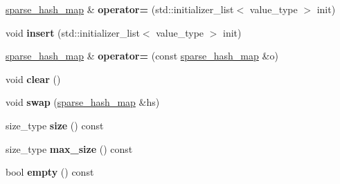 \begin{DoxyCompactItemize}
\item 
\hyperlink{classspp___1_1sparse__hash__map}{sparse\+\_\+hash\+\_\+map} \& {\bfseries operator=} (std\+::initializer\+\_\+list$<$ value\+\_\+type $>$ init)\hypertarget{classspp___1_1sparse__hash__map_abc26f86eaa71c65110261637dbeccb91}{}\label{classspp___1_1sparse__hash__map_abc26f86eaa71c65110261637dbeccb91}

\item 
void {\bfseries insert} (std\+::initializer\+\_\+list$<$ value\+\_\+type $>$ init)\hypertarget{classspp___1_1sparse__hash__map_a76f10efad8d33a8b331db9bcf23b795c}{}\label{classspp___1_1sparse__hash__map_a76f10efad8d33a8b331db9bcf23b795c}

\item 
\hyperlink{classspp___1_1sparse__hash__map}{sparse\+\_\+hash\+\_\+map} \& {\bfseries operator=} (const \hyperlink{classspp___1_1sparse__hash__map}{sparse\+\_\+hash\+\_\+map} \&o)\hypertarget{classspp___1_1sparse__hash__map_a1b28975f5957feb258bda6e942fd7b6c}{}\label{classspp___1_1sparse__hash__map_a1b28975f5957feb258bda6e942fd7b6c}

\item 
void {\bfseries clear} ()\hypertarget{classspp___1_1sparse__hash__map_abf0b2413fd153412923a48c2d912b198}{}\label{classspp___1_1sparse__hash__map_abf0b2413fd153412923a48c2d912b198}

\item 
void {\bfseries swap} (\hyperlink{classspp___1_1sparse__hash__map}{sparse\+\_\+hash\+\_\+map} \&hs)\hypertarget{classspp___1_1sparse__hash__map_a2541144a8650653e3f7c35a53ef24e33}{}\label{classspp___1_1sparse__hash__map_a2541144a8650653e3f7c35a53ef24e33}

\item 
size\+\_\+type {\bfseries size} () const \hypertarget{classspp___1_1sparse__hash__map_a8b198d7096fb709e898297107a0534fd}{}\label{classspp___1_1sparse__hash__map_a8b198d7096fb709e898297107a0534fd}

\item 
size\+\_\+type {\bfseries max\+\_\+size} () const \hypertarget{classspp___1_1sparse__hash__map_aeab98e173beb6774d5290541a8ac4cf9}{}\label{classspp___1_1sparse__hash__map_aeab98e173beb6774d5290541a8ac4cf9}

\item 
bool {\bfseries empty} () const \hypertarget{classspp___1_1sparse__hash__map_ade6c934e7cf29e33e7ff7f3a79966eea}{}\label{classspp___1_1sparse__hash__map_ade6c934e7cf29e33e7ff7f3a79966eea}


\end{DoxyCompactItemize}
